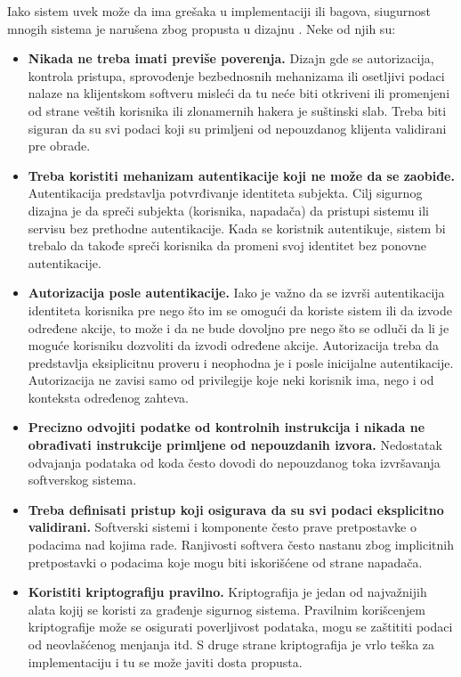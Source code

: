 \documentclass[a4paper]{article}
\begin{document}
Iako sistem uvek može da ima grešaka u implementaciji ili bagova, siugurnost mnogih sistema je narušena zbog propusta u dizajnu \cite{top10flaws}.
Neke od njih su:
\begin{itemize}
\item \textbf{Nikada ne treba imati previše poverenja.}
    Dizajn gde se autorizacija, kontrola pristupa, sprovođenje bezbednosnih mehanizama ili osetljivi podaci nalaze na klijentskom softveru misleći da tu neće biti otkriveni ili promenjeni od strane veštih korisnika ili zlonamernih hakera je suštinski slab. Treba biti siguran da su svi podaci koji su primljeni od nepouzdanog klijenta validirani pre obrade.
\item \textbf{Treba koristiti mehanizam autentikacije koji ne može da se zaobiđe.}
    Autentikacija predstavlja potvrđivanje identiteta subjekta. Cilj sigurnog dizajna je da spreči subjekta (korisnika, napadača) da pristupi sistemu ili servisu bez prethodne autentikacije. Kada se koristnik autentikuje, sistem bi trebalo da takođe spreči korisnika da promeni svoj identitet bez ponovne autentikacije.
\item \textbf{Autorizacija posle autentikacije.}
    Iako je važno da se izvrši autentikacija identiteta korisnika pre nego što im se omogući da koriste sistem ili da izvode određene akcije, to može i da ne bude dovoljno pre nego što se odluči da li je moguće korisniku dozvoliti da izvodi određene akcije. Autorizacija treba da predstavlja eksiplicitnu proveru i neophodna je i posle inicijalne autentikacije. Autorizacija ne zavisi samo od privilegije koje neki korisnik ima, nego i od konteksta određenog zahteva.
\item \textbf{Precizno odvojiti podatke od kontrolnih instrukcija i nikada ne obrađivati instrukcije primljene od nepouzdanih izvora.}
    Nedostatak odvajanja podataka od koda često dovodi do nepouzdanog toka izvršavanja softverskog sistema.
\item \textbf{Treba definisati pristup koji osigurava da su svi podaci eksplicitno validirani.} 
    Softverski sistemi i komponente često prave pretpostavke o podacima nad kojima rade. Ranjivosti softvera često nastanu zbog implicitnih pretpostavki o podacima koje mogu biti iskorišćene od strane napadača. 
\item \textbf{Koristiti kriptografiju pravilno.} 
    Kriptografija je jedan od najvažnijih alata kojij se koristi za građenje sigurnog sistema. Pravilnim korišcenjem kriptografije može se osigurati poverljivost podataka, mogu se zaštititi podaci od neovlašćenog menjanja itd. S druge strane kriptografija je vrlo teška za implementaciju i tu se može javiti dosta propusta.

\end{itemize}
\end{document}
